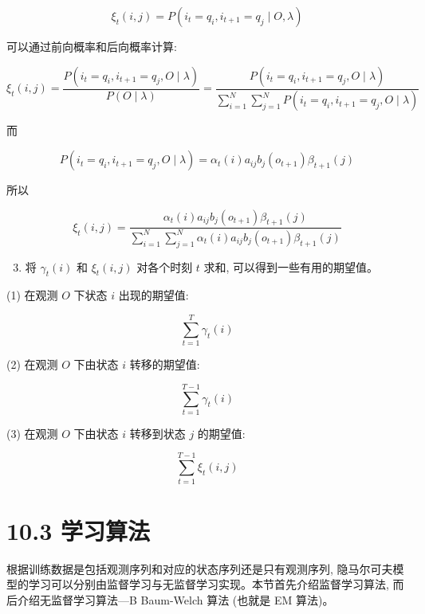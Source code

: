 \documentclass[10pt]{article}
\begin{document}
\begin{equation*}
\xi_{t}(i, j)=P\left(i_{t}=q_{i}, i_{t+1}=q_{j} \mid O, \lambda\right) \tag{10.25}
\end{equation*}


可以通过前向概率和后向概率计算:

$$
\xi_{t}(i, j)=\frac{P\left(i_{t}=q_{i}, i_{t+1}=q_{j}, O \mid \lambda\right)}{P(O \mid \lambda)}=\frac{P\left(i_{t}=q_{i}, i_{t+1}=q_{j}, O \mid \lambda\right)}{\sum_{i=1}^{N} \sum_{j=1}^{N} P\left(i_{t}=q_{i}, i_{t+1}=q_{j}, O \mid \lambda\right)}
$$

而

$$
P\left(i_{t}=q_{i}, i_{t+1}=q_{j}, O \mid \lambda\right)=\alpha_{t}(i) a_{i j} b_{j}\left(o_{t+1}\right) \beta_{t+1}(j)
$$

所以


\begin{equation*}
\xi_{t}(i, j)=\frac{\alpha_{t}(i) a_{i j} b_{j}\left(o_{t+1}\right) \beta_{t+1}(j)}{\sum_{i=1}^{N} \sum_{j=1}^{N} \alpha_{t}(i) a_{i j} b_{j}\left(o_{t+1}\right) \beta_{t+1}(j)} \tag{10.26}
\end{equation*}


\begin{enumerate}
  \setcounter{enumi}{2}
  \item 将 $\gamma_{t}(i)$ 和 $\xi_{t}(i, j)$ 对各个时刻 $t$ 求和, 可以得到一些有用的期望值。
\end{enumerate}

(1) 在观测 $O$ 下状态 $i$ 出现的期望值:


\begin{equation*}
\sum_{t=1}^{T} \gamma_{t}(i) \tag{10.27}
\end{equation*}


(2) 在观测 $O$ 下由状态 $i$ 转移的期望值:


\begin{equation*}
\sum_{t=1}^{T-1} \gamma_{t}(i) \tag{10.28}
\end{equation*}


(3) 在观测 $O$ 下由状态 $i$ 转移到状态 $j$ 的期望值:


\begin{equation*}
\sum_{t=1}^{T-1} \xi_{t}(i, j) \tag{10.29}
\end{equation*}


\section*{10.3 学习算法}
根据训练数据是包括观测序列和对应的状态序列还是只有观测序列, 隐马尔可夫模型的学习可以分别由监督学习与无监督学习实现。本节首先介绍监督学习算法, 而后介绍无监督学习算法—B Baum-Welch 算法 (也就是 EM 算法)。
\end{document}
